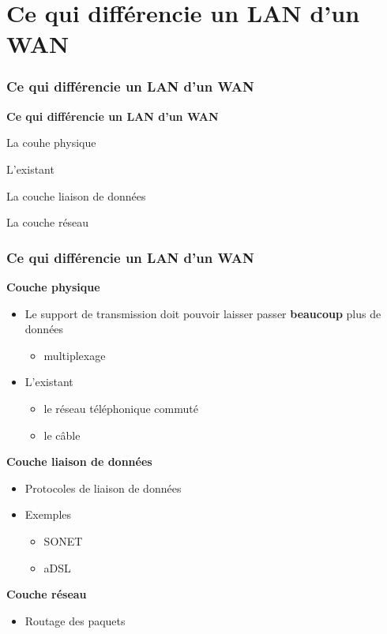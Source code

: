 \section{Ce qui différencie un LAN d'un WAN}

\begin{frame}[fragile]
  \frametitle{Ce qui différencie un LAN d'un WAN}
\begin{center}
	\Huge{\bf\color{blue}Ce qui différencie un LAN d'un WAN}
\end{center}
\begin{flushright}
  \item La couhe physique
  \item L'existant
  \item La couche liaison de données
  \item La couche réseau
\end{flushright}
\end{frame}

\begin{frame}[fragile]
  \frametitle{Ce qui différencie un LAN d'un WAN}
\textbf{Couche physique}
\begin{itemize}
	\item Le support de transmission doit pouvoir laisser passer
	\textbf{beaucoup} plus de données
	\begin{itemize}
		\item multiplexage
	\end{itemize}
	\item L'existant
	\begin{itemize}
		\item le réseau téléphonique commuté
		\item le câble
	\end{itemize}
\end{itemize}
\textbf{Couche liaison de données}
	\begin{itemize}
		\item Protocoles de liaison de données
		\item Exemples
		\begin{itemize}
			\item SONET
			\item aDSL
		\end{itemize}
	\end{itemize}
\textbf{Couche réseau}
	\begin{itemize}
		\item Routage des paquets
	\end{itemize}
\end{frame}

